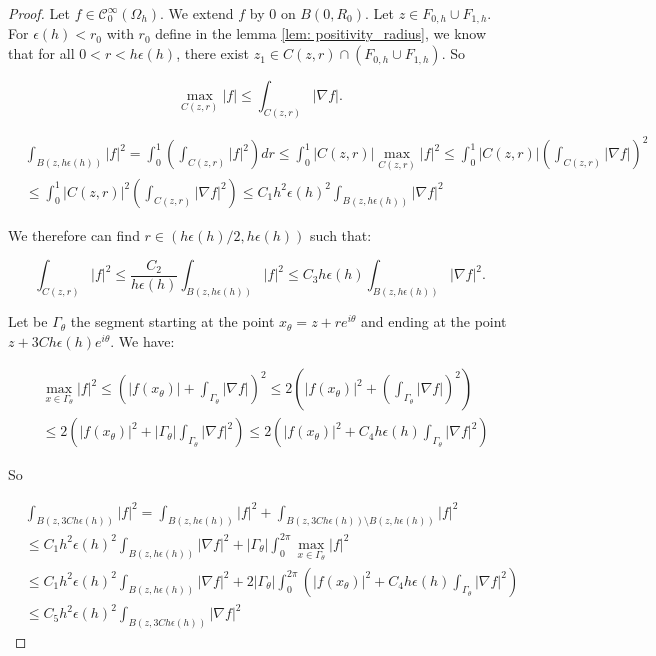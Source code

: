 \documentclass[leqno,11pt,letterpaper, english]{amsart}
\newcommand{\nn}{\nonumber}
\theoremstyle{plain}
\theoremstyle{definition}
\numberwithin{equation}{section}
\begin{document}
	\begin{proof}
		Let $f \in \mathcal{C}_0^\infty(\Omega_h)$. We extend $f$ by $0$ on $B(0,R_0)$. Let $z \in  F_{0,h}\cup F_{1,h} $. For $\epsilon(h)<r_0$ with $r_0$
define in the lemma \ref{lem: positivity_radius}, we know that for all $0<r<h\epsilon(h)$, there exist $z_1 \in C(z,r)\cap ( F_{0,h}\cup F_{1,h})$. So
		
		\begin{equation}
			\max_{C(z,r)} |f|\leq \int_{C(z,r)}|\nabla f|.
		\end{equation}  
		
		
		\begin{align}
			&\int_{B(z,h\epsilon(h))} |f|^2= \int_0^1 \left(\int_{C(z,r)}|f|^2\right) dr\leq \int_0^1 |C(z,r)|\max_{C(z,r)} |f|^2\leq \int_0^1 |C(z,r)|\left(\int_{C(z,r)}|\nabla f|\right)^2\nn\\
			&\leq \int_0^1 |C(z,r)|^2\left(\int_{C(z,r)}|\nabla f|^2\right)\leq C_1h^2\epsilon(h)^2 \int_{B(z,h\epsilon(h))}|\nabla f|^2
		\end{align}
		
		We therefore can find $r\in (h\epsilon(h)/2,h\epsilon(h))$ such that:
		
		\begin{equation}
			\int_{C(z,r)}|f|^2\leq \frac{C_2}{h\epsilon(h)} \int_{B(z,h\epsilon(h))} |f|^2\leq C_3h\epsilon(h) \int_{B(z,h\epsilon(h))}|\nabla f|^2.
		\end{equation}
		
		Let be $\Gamma_\theta$ the segment starting at the point $x_\theta=z+re^{i\theta}$ and ending at the point $z+3Ch\epsilon(h)e^{i\theta}$.
		We have:
		
		\begin{align}
			&\max_{x\in \Gamma_\theta} |f|^2\leq\left(|f(x_\theta)|+\int_{\Gamma_\theta} |\nabla f| \right)^2\leq 2 \left(|f(x_\theta)|^2+\left(\int_{\Gamma_\theta} |\nabla f|\right)^2 \right)\nn\\
			&\leq  2 \left(|f(x_\theta)|^2+|\Gamma_\theta|\int_{\Gamma_\theta} |\nabla f|^2 \right)\leq 2 \left(|f(x_\theta)|^2+C_4 h\epsilon(h)\int_{\Gamma_\theta} |\nabla f|^2 \right)
		\end{align}
		
		So
		
		\begin{align}
			&\int_{B(z,3Ch\epsilon(h))} |f|^2= \int_{B(z,h\epsilon(h))} |f|^2+\int_{B(z,3Ch\epsilon(h))\setminus B(z,h\epsilon(h))} |f|^2 \nn\\
			&\leq C_1h^2\epsilon(h)^2 \int_{B(z,h\epsilon(h))}|\nabla f|^2 +|\Gamma_\theta|\int_0^{2\pi}\max_{x\in \Gamma_\theta} |f|^2\nn\\
			&\leq C_1h^2\epsilon(h)^2 \int_{B(z,h\epsilon(h))}|\nabla f|^2 +2|\Gamma_\theta| \int_0^{2\pi}\left(|f(x_\theta)|^2+C_4 h\epsilon(h)\int_{\Gamma_\theta} |\nabla f|^2 \right)\nn\\
			&\leq C_5 h^2\epsilon(h)^2 \int_{B(z,3Ch\epsilon(h))} |\nabla f|^2
		\end{align}
		

\end{proof}
\end{document}
